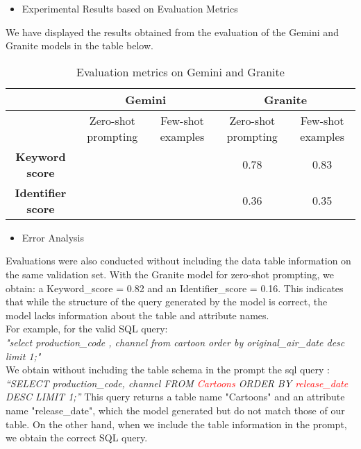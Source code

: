 \documentclass[12pt,a4paper]{article}
\begin{document}
  \begin{itemize}
  \item Experimental Results based on Evaluation Metrics
  \end{itemize}
  We have displayed the results obtained from the evaluation of the Gemini and Granite models in the table below.
  
  \begin{table}[h]
      \centering
      \small %
      \begin{tabular}{|c|c|c|c|c|}
          \hline
          & \multicolumn{2}{c|}{\textbf{Gemini}} & \multicolumn{2}{c|}{\textbf{Granite}} \\ \hline
          & Zero-shot prompting & Few-shot examples & Zero-shot prompting & Few-shot examples \\ \hline
          \textbf{Keyword score} & & & 0.78 & 0.83 \\ \hline
          \textbf{Identifier score} & & & 0.36 & 0.35 \\ \hline
      \end{tabular}
      \caption{Evaluation metrics on Gemini and Granite}
      \label{tab:comparison}
  \end{table}
  
  \begin{itemize}
  \item Error Analysis
  \end{itemize}
  
  Evaluations were also conducted without including the data table information on the same validation set. With the Granite model for zero-shot prompting, we obtain: a Keyword\_score = 0.82 and an Identifier\_score = 0.16. 
  This indicates that while the structure of the query generated by the model is correct, the model lacks information about the table and attribute names.\\
  For example, for the valid SQL query:\\ \textit{"select production\_code ,  channel from cartoon order by original\_air\_date desc limit 1;"\\}
  We obtain without including the table schema in the prompt the sql query : \\
  \textit{“SELECT production\_code, channel FROM \textcolor{red}{Cartoons} ORDER BY \textcolor{red}{release\_date} DESC LIMIT 1;”}
  This query returns a table name "Cartoons" and an attribute name "release\_date", which the model generated but do not match those of our table. On the other hand, when we include the table information in the prompt, we obtain the correct SQL query.\vspace{1cm}
  
\end{document}

